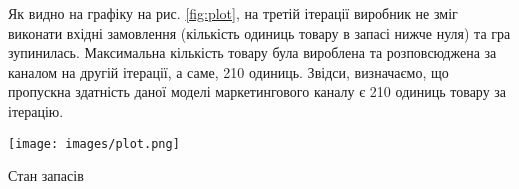 Як видно на графіку на рис. \ref{fig:plot}, на третій ітерації виробник не зміг виконати вхідні замовлення (кількість одиниць товару в запасі нижче нуля) та гра зупинилась. Максимальна кількість товару була вироблена та розповсюджена за каналом на другій ітерації, а саме, 210 одиниць. Звідси, визначаємо, що пропускна здатність даної моделі маркетингового каналу є 210 одиниць товару за ітерацію. 

\begin{stdfigure}
    \texttt{[image: images/plot.png]}
    \caption{Стан запасів}
    \label{fig:plot}
\end{stdfigure}

